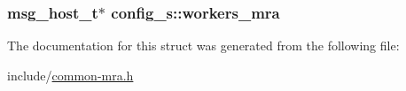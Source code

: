 \hypertarget{structconfig__s_a25044c7b99a27e3823ec661de25d38d5}{
\subsubsection[{workers\-\_\-mra}]{\setlength{\rightskip}{0pt plus 5cm}msg\-\_\-host\-\_\-t$\ast$ {\bf config\-\_\-s\-::workers\-\_\-mra}}}\label{structconfig__s_a25044c7b99a27e3823ec661de25d38d5}


\-The documentation for this struct was generated from the following file\-:\begin{DoxyCompactItemize}
\item 
include/\hyperlink{common-mra_8h}{common-\/mra.\-h}\end{DoxyCompactItemize}
